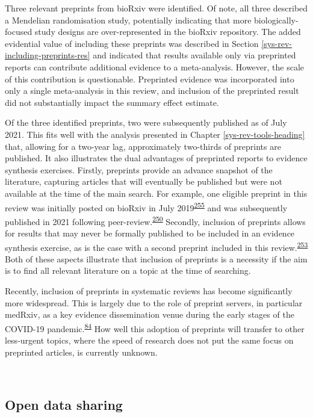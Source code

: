 \documentclass[a4paper, twoside]{templates/ociamthesis}
\begin{document}
Three relevant preprints from bioRxiv were identified. Of note, all three described a Mendelian randomisation study, potentially indicating that more biologically-focused study designs are over-represented in the bioRxiv repository. The added evidential value of including these preprints was described in Section \ref{sys-rev-including-preprints-res} and indicated that results available only via preprinted reports can contribute additional evidence to a meta-analysis. However, the scale of this contribution is questionable. Preprinted evidence was incorporated into only a single meta-analysis in this review, and inclusion of the preprinted result did not substantially impact the summary effect estimate.

Of the three identified preprints, two were subsequently published as of July 2021. This fits well with the analysis presented in Chapter \ref{sys-rev-tools-heading} that, allowing for a two-year lag, approximately two-thirds of preprints are published. It also illustrates the dual advantages of preprinted reports to evidence synthesis exercises. Firstly, preprints provide an advance snapshot of the literature, capturing articles that will eventually be published but were not available at the time of the main search. For example, one eligible preprint in this review was initially posted on bioRxiv in July 2019\textsuperscript{\protect\hyperlink{ref-andrews2019}{255}} and was subsequently published in 2021 following peer-review.\textsuperscript{\protect\hyperlink{ref-andrews2021}{250}} Secondly, inclusion of preprints allows for results that may never be formally published to be included in an evidence synthesis exercise, as is the case with a second preprint included in this review.\textsuperscript{\protect\hyperlink{ref-so2017}{253}} Both of these aspects illustrate that inclusion of preprints is a necessity if the aim is to find all relevant literature on a topic at the time of searching.

Recently, inclusion of preprints in systematic reviews has become significantly more widespread. This is largely due to the role of preprint servers, in particular medRxiv, as a key evidence dissemination venue during the early stages of the COVID-19 pandemic.\textsuperscript{\protect\hyperlink{ref-fraser2020preprinting}{84}} How well this adoption of preprints will transfer to other less-urgent topics, where the speed of research does not put the same focus on preprinted articles, is currently unknown.

~

\hypertarget{sys-rev-open-data}{%
\subsection{Open data sharing}\label{sys-rev-open-data}}
\end{document}
